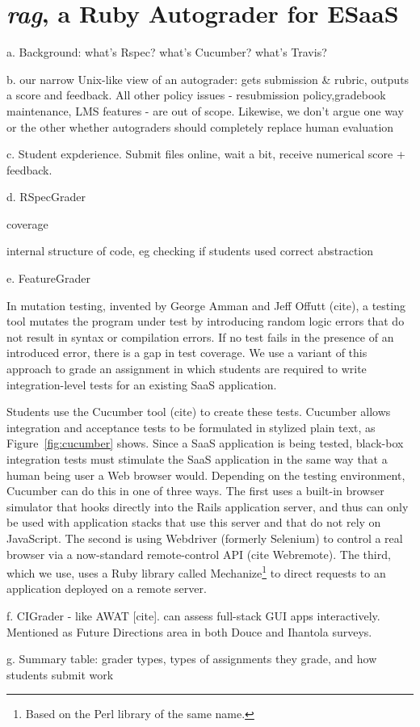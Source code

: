 \section{\emph{rag}, a Ruby Autograder for ESaaS}



a.	Background: what's Rspec? what's Cucumber? what's Travis?

b.	our narrow Unix-like view of an autograder: gets submission & rubric, outputs a score and feedback. All other policy issues - resubmission policy,gradebook maintenance, LMS features - are out of scope.  Likewise, we don't argue one way or the other whether autograders should completely replace human evaluation

c.	Student expderience. Submit files online, wait a bit, receive numerical score + feedback.

d.	RSpecGrader

coverage

internal structure of code, eg checking if students used correct
abstraction 



e.	FeatureGrader


In mutation testing, invented by George Amman and Jeff Offutt (cite), a
testing tool mutates the program under test by introducing random logic
errors that do not result in syntax or compilation errors.  If no test fails
in the presence of an introduced error, there is a gap in test
coverage.  We use a variant of this approach to grade an
assignment in which students are required to write integration-level
tests for an existing SaaS application.

Students use the Cucumber tool (cite) to create these tests.
Cucumber allows integration and acceptance tests to be formulated in
stylized plain text, as Figure~\ref{fig:cucumber} shows.
Since a SaaS application is being tested, black-box integration tests
must stimulate the SaaS application in the same way that
a human being user a Web browser would.
Depending on the testing environment, Cucumber can do this in one of
three ways.  The first uses a built-in browser simulator that hooks
directly into 
the Rails application server, and thus can only be used
with application stacks that use this server and that do not rely on
JavaScript.  The second is using Webdriver (formerly 
Selenium) to control a real browser via a now-standard remote-control
API (cite Webremote).  The third, which we use, uses a Ruby library called
Mechanize\footnote{Based on the Perl library of the same name.} to
direct requests to an application deployed on  a remote server.  


f.	CIGrader - like AWAT [cite]. can assess full-stack GUI apps interactively. Mentioned as Future  Directions area in both Douce and Ihantola surveys.

g.	Summary table: grader types, types of assignments they grade, and how students submit work



